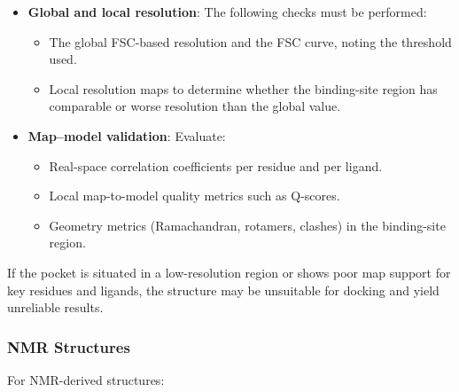 \documentclass[12pt]{article}
\begin{document}
\begin{itemize}
\subsubsection{Cryo-EM Structures}
For structures derived from cryo-EM:
 \item \textbf{Global and local resolution}: The following checks must be performed:

\begin{itemize}
  \item The global FSC-based resolution and the FSC curve, noting the threshold used.
  \item Local resolution maps to determine whether the binding-site region has comparable or worse resolution than the global value.
\end{itemize}

 \item \textbf{Map--model validation}: Evaluate:
 
\begin{itemize}
  \item Real-space correlation coefficients per residue and per ligand.
  \item Local map-to-model quality metrics such as Q-scores.\cite{CH4_Pintilie2020_Qscore,CH4_pintilie2021validation}
  \item Geometry metrics (Ramachandran, rotamers, clashes) in the binding-site region.\cite{CH4_Williams2018_MolProbity}
\end{itemize}
\end{itemize}

If the pocket is situated in a low-resolution region or shows poor map support for key residues and ligands, the structure may be unsuitable for docking and yield unreliable results. 

\subsubsection{NMR Structures}

For NMR-derived structures:
\end{document}
